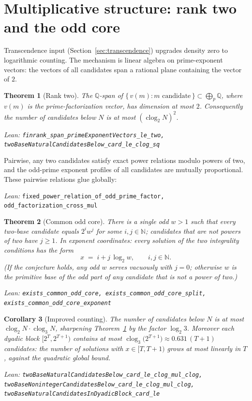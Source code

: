 \documentclass[11pt]{article}
\newtheorem{theorem}{Theorem}[section]
\newtheorem{corollary}[theorem]{Corollary}
\theoremstyle{definition}
\theoremstyle{remark}
\newcommand{\N}{\mathbb{N}}
\newcommand{\Q}{\mathbb{Q}}
\newcommand{\lean}[1]{\par\smallskip\noindent\begingroup\footnotesize\raggedright\emph{Lean:} \texttt{#1}\par\endgroup}
\newcommand{\clog}{\operatorname{clog}}
\begin{document}
\section{Multiplicative structure: rank two and the odd core}\label{sec:rank}

Transcendence input (Section~\ref{sec:transcendence}) upgrades density zero to logarithmic
counting. The mechanism is linear algebra on prime-exponent vectors: the vectors of all
candidates span a rational plane containing the vector of $2$.

\begin{theorem}[Rank two]\label{thm:rank2}
The $\Q$-span of $\{\,v(m) : m \text{ candidate}\,\}\subset\bigoplus_p\Q$, where $v(m)$ is
the prime-factorization vector, has dimension at most $2$. Consequently the number of
candidates below $N$ is at most $(\clog_2 N)^2$.
\lean{finrank\_span\_primeExponentVectors\_le\_two,
twoBaseNaturalCandidatesBelow\_card\_le\_clog\_sq}
\end{theorem}

Pairwise, any two candidates satisfy exact power relations modulo powers of two, and the
odd-prime exponent profiles of all candidates are mutually proportional. These pairwise
relations glue globally:
\lean{fixed\_power\_relation\_of\_odd\_prime\_factor, odd\_factorization\_cross\_mul}

\begin{theorem}[Common odd core]\label{thm:oddcore}
There is a single odd $w>1$ such that every two-base candidate equals $2^i w^j$ for some
$i,j\in\N$; candidates that are not powers of two have $j\ge 1$. In exponent coordinates:
every solution of the two integrality conditions has the form
\[
x \;=\; i + j\,\log_2 w, \qquad i,j\in\N .
\]
(If the conjecture holds, any odd $w$ serves vacuously with $j=0$; otherwise $w$ is the
primitive base of the odd part of any candidate that is not a power of two.)
\lean{exists\_common\_odd\_core, exists\_common\_odd\_core\_split,
exists\_common\_odd\_core\_exponent}
\end{theorem}

\begin{corollary}[Improved counting]\label{cor:counting}
The number of candidates below $N$ is at most $\clog_2 N\cdot\clog_3 N$, sharpening
Theorem~\ref{thm:rank2} by the factor $\log_2 3$. Moreover each dyadic block
$[2^T,2^{T+1})$ contains at most $\clog_3\!\big(2^{T+1}\big)\approx 0.631\,(T+1)$
candidates: the number of solutions with $x\in[T,T+1)$ grows at most linearly in $T$,
against the quadratic global bound.
\lean{twoBaseNaturalCandidatesBelow\_card\_le\_clog\_mul\_clog,
twoBaseNonintegerCandidatesBelow\_card\_le\_clog\_mul\_clog,
twoBaseNaturalCandidatesInDyadicBlock\_card\_le}
\end{corollary}
\end{document}
